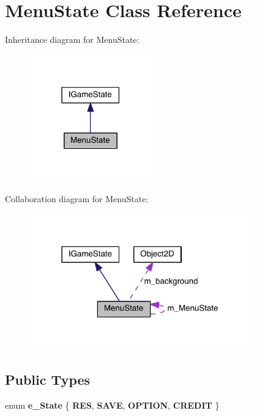 \hypertarget{class_menu_state}{}\section{Menu\+State Class Reference}
\label{class_menu_state}


Inheritance diagram for Menu\+State\+:\nopagebreak
\begin{figure}[H]
\begin{center}
\leavevmode
\includegraphics[width=150pt]{class_menu_state__inherit__graph}
\end{center}
\end{figure}


Collaboration diagram for Menu\+State\+:\nopagebreak
\begin{figure}[H]
\begin{center}
\leavevmode
\includegraphics[width=273pt]{class_menu_state__coll__graph}
\end{center}
\end{figure}
\subsection*{Public Types}
\begin{DoxyCompactItemize}
\item 
\hypertarget{class_menu_state_ae0708f856423b879935e7fdf322cc836}{}enum {\bfseries e\+\_\+\+State} \{ {\bfseries R\+E\+S}, 
{\bfseries S\+A\+V\+E}, 
{\bfseries O\+P\+T\+I\+O\+N}, 
{\bfseries C\+R\+E\+D\+I\+T}
 \}\label{class_menu_state_ae0708f856423b879935e7fdf322cc836}

\end{DoxyCompactItemize}
